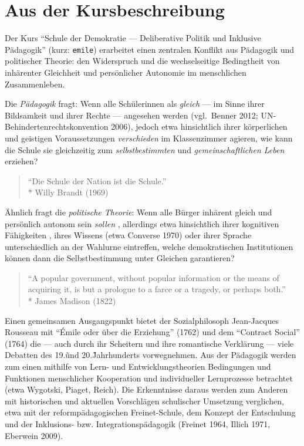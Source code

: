 \section[Kursbeschreibung]{Aus der Kursbeschreibung}

Der Kurs ``Schule der Demokratie --- Deliberative Politik und Inklusive Pädagogik'' (kurz: \lstinline{emile}) erarbeitet einen zentralen Konflikt aus Pädagogik und politischer Theorie:
den Widerspruch und die wechselseitige Bedingtheit von inhärenter Gleichheit und persönlicher Autonomie im menschlichen Zusammenleben.

Die \emph{Pädagogik} fragt:
Wenn alle Schülerinnen als \emph{gleich} --- im Sinne ihrer Bildsamkeit und ihrer Rechte --- angesehen werden (vgl.\ Benner 2012; UN-Behindertenrechtskonvention 2006),
jedoch etwa hinsichtlich ihrer körperlichen und geistigen Voraussetzungen \emph{verschieden} im Klassenzimmer agieren, wie kann die Schule sie gleichzeitig zum \emph{selbstbestimmten} und \emph{gemeinschaftlichen Leben} erziehen?

\begin{quote}
    ``Die Schule der Nation ist die Schule.''\\*
    Willy Brandt (1969)
\end{quote}

Ähnlich fragt die \emph{politische Theorie}:
Wenn alle Bürger inhärent gleich und persönlich autonom sein \emph{sollen} \parencite[etwa][]{Dahl-1989-aa}, allerdings etwa hinsichtlich ihrer kognitiven Fähigkeiten \parencite{Rosenberg-2002-aa}, ihres Wissens \parencite{} (etwa Converse 1970) oder ihrer Sprache unterschiedlich an der Wahlurne eintreffen, welche demokratischen Institutionen können dann die Selbstbestimmung unter Gleichen garantieren?

\begin{quote}
    ``A popular government, without popular information or the means of acquiring it, is but a prologue to a farce or a tragedy, or perhaps both.''\\*
    James Madison (1822)
\end{quote}

Einen gemeinsamen Ausgangspunkt bietet der Sozialphilosoph Jean-Jacques Rousseau mit ``Émile oder über die Erziehung'' (1762) und dem ``Contract Social'' (1764) die --- auch durch ihr Scheitern und ihre romantische Verklärung --- viele Debatten des 19.\~ und 20.\~ Jahrhunderts vorwegnehmen.
Aus der Pädagogik werden zum einen mithilfe von Lern- und Entwicklungstheorien Bedingungen und Funktionen menschlicher Kooperation und individueller Lernprozesse betrachtet (etwa Wygotski, Piaget, Reich).
Die Erkenntnisse daraus werden zum Anderen mit historischen und aktuellen Vorschlägen schulischer Umsetzung verglichen, etwa mit der reformpädagogischen Freinet-Schule, dem Konzept der Entschulung und der Inklusions- bzw. Integrationspädagogik (Freinet 1964, Illich 1971, Eberwein 2009).

